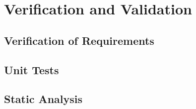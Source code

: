 \section{Verification and Validation}

\subsection{Verification of Requirements}

\subsection{Unit Tests}

\subsection{Static Analysis}
